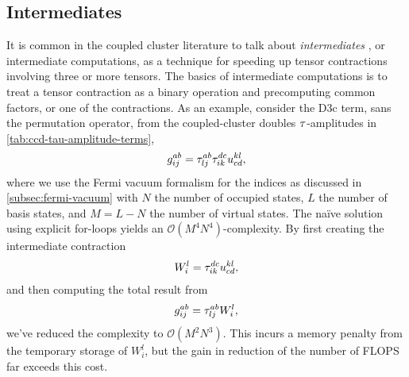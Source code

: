         \subsection{Intermediates}
            It is common in the coupled cluster literature to talk about
            \emph{intermediates} \cite{gauss1995coupled, hjorth2017advanced}, or
            intermediate computations, as a technique for speeding up tensor
            contractions involving three or more tensors.
            The basics of intermediate computations is to treat a tensor
            contraction as a binary operation and precomputing common factors,
            or one of the contractions.
            As an example, consider the D3c term, sans the permutation operator,
            from the coupled-cluster doubles $\tau$-amplitudes in
            \autoref{tab:ccd-tau-amplitude-terms},
            \begin{align}
                g^{ab}_{ij} = \tau^{ab}_{lj} \tau^{dc}_{ik}
                u^{kl}_{cd},
            \end{align}
            where we use the Fermi vacuum formalism for the indices as discussed
            in \autoref{subsec:fermi-vacuum} with $N$ the number of occupied
            states, $L$ the number of basis states, and $M = L - N$ the number
            of virtual states.
            The naïve solution using explicit for-loops yields an
            $\mathcal{O}(M^4 N^4)$-complexity.
            By first creating the intermediate contraction
            \begin{align}
                W^{l}_{i} = \tau^{dc}_{ik} u^{kl}_{cd},
                \label{eq:w_li}
            \end{align}
            and then computing the total result from
            \begin{align}
                g^{ab}_{ij} = \tau^{ab}_{lj} W^{l}_{i},
            \end{align}
            we've reduced the complexity to $\mathcal{O}(M^2 N^3)$.
            This incurs a memory penalty from the temporary storage of
            $W^{l}_{i}$, but the gain in reduction of the number of FLOPS far
            exceeds this cost.

